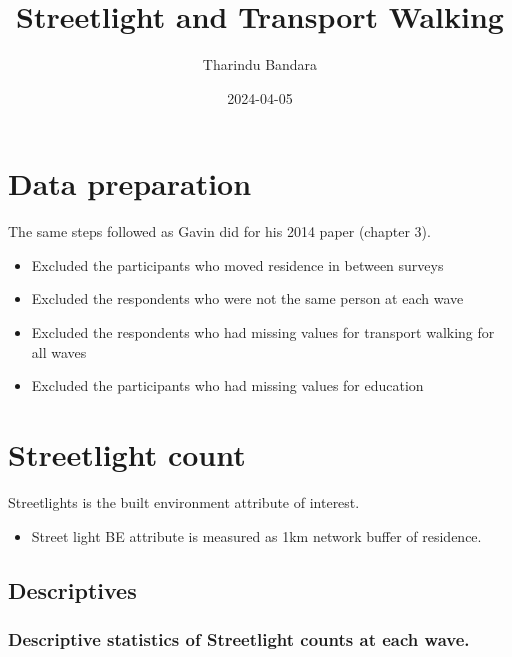 \documentclass[
]{book}
\title{Streetlight and Transport Walking}
\author{Tharindu Bandara}
\date{2024-04-05}
\providecommand{\tightlist}{%
  \setlength{\itemsep}{0pt}\setlength{\parskip}{0pt}}
\begin{document}
\maketitle

{
\setcounter{tocdepth}{1}
\tableofcontents
}
\hypertarget{data-preparation}{%
\chapter{Data preparation}\label{data-preparation}}

The same steps followed as Gavin did for his 2014 paper (chapter 3).

\begin{itemize}
\tightlist
\item
  Excluded the participants who moved residence in between surveys
\item
  Excluded the respondents who were not the same person at each wave
\item
  Excluded the respondents who had missing values for transport walking for all waves
\item
  Excluded the participants who had missing values for education
\end{itemize}

\hypertarget{streetlight-count}{%
\chapter{Streetlight count}\label{streetlight-count}}

Streetlights is the built environment attribute of interest.

\begin{itemize}
\tightlist
\item
  Street light BE attribute is measured as 1km network buffer of residence.
\end{itemize}

\hypertarget{descriptives}{%
\section{Descriptives}\label{descriptives}}

\hypertarget{descriptive-statistics-of-streetlight-counts-at-each-wave.}{%
\subsection{Descriptive statistics of Streetlight counts at each wave.}\label{descriptive-statistics-of-streetlight-counts-at-each-wave.}}
\end{document}
